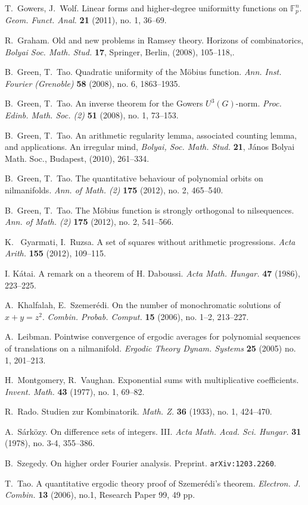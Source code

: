 \documentclass[11pt]{amsart}
\theoremstyle{definition}
\begin{document}
\begin{thebibliography}{9999}
  T.~Gowers, J.~Wolf. Linear forms and higher-degree
uniformitty functions on $\mathbb{F}_p^n$. {\em  Geom. Funct. Anal.}
{\bf 21} (2011), no. 1, 36--69.

  R.~Graham. Old and new problems in Ramsey theory.
Horizons of combinatorics, {\em  Bolyai Soc. Math. Stud.}  {\bf 17},
Springer, Berlin, (2008), 105--118,.

 B.~Green, T.~Tao. Quadratic uniformity of the M\"obius function. {\em  Ann.
Inst. Fourier (Grenoble)} {\bf 58} (2008), no. 6,
1863--1935.

  B.~Green, T.~Tao. An inverse theorem for the Gowers  $U^3(G)$-norm.
  {\em Proc. Edinb. Math. Soc. (2)} {\bf 51} (2008), no. 1, 73--153.

 B.~Green, T.~Tao. An arithmetic regularity lemma, associated counting lemma,
and applications. An irregular mind,  {\em Bolyai, Soc. Math. Stud.}
{\bf 21},  J\'anos Bolyai Math. Soc., Budapest, (2010), 261--334.

 B.~Green, T.~Tao.  The quantitative behaviour of polynomial orbits on nilmanifolds.
{\em Ann. of Math. (2)} {\bf 175} (2012),   no. 2, 465--540.

 B.~Green, T.~Tao.
The M\"obius function is strongly orthogonal to nilsequences. {\em
Ann. of Math. (2)} {\bf 175}
 (2012), no. 2, 541--566.

 K.~ Gyarmati, I.~Ruzsa. A set of squares without arithmetic
progressions. {\em Acta Arith.} {\bf  155} (2012), 109--115.

 I. K\'atai. A remark on a theorem of H. Daboussi. {\em Acta Math. Hungar.}
 {\bf 47}
(1986), 223--225.

 A.~Khalfalah, E.~Szemer\'edi.
 On the number of monochromatic solutions of $x+y=z^2$.
{\em Combin. Probab. Comput.} {\bf 15} (2006), no. 1--2,
213--227.

 A.~Leibman.  Pointwise convergence of ergodic
  averages for polynomial sequences of translations on a nilmanifold.
  {\it Ergodic Theory Dynam.  Systems} \textbf{25} (2005) no. 1,
  201--213.

 H.~Montgomery, R.~Vaughan.  Exponential sums with multiplicative coefficients.
 {\em Invent. Math.} {\bf 43} (1977), no. 1, 69--82.

 R.~Rado.  Studien zur Kombinatorik. {\em Math. Z.} {\bf 36} (1933), no. 1,
424--470.

 A.~S\'ark\"ozy. On difference sets of integers. III.
{\em Acta Math. Acad. Sci. Hungar.} {\bf 31} (1978), no. 3-4,
355--386.

 B.~Szegedy. On higher order Fourier analysis.
Preprint. {\tt arXiv:1203.2260}.

 T.~Tao. A quantitative ergodic theory proof of Szemer\'edi's theorem.
{\em Electron. J. Combin.} {\bf 13} (2006), no.1, Research Paper 99, 49 pp.

\end{thebibliography}
\end{document}

